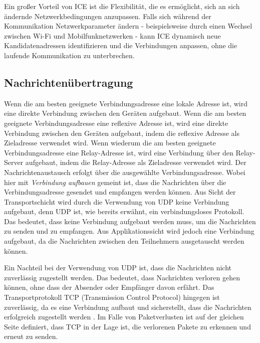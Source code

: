\noindent Ein großer Vorteil von ICE ist die Flexibilität, die es ermöglicht, sich an sich ändernde Netzwerkbedingungen anzupassen. Falls sich während der Kommunikation Netzwerkparameter ändern - beispielsweise durch einen Wechsel zwischen Wi-Fi und Mobilfunknetzwerken - kann ICE dynamisch neue Kandidatenadressen identifizieren und die Verbindungen anpassen, ohne die laufende Kommunikation zu unterbrechen.

\subsection{Nachrichtenübertragung}

Wenn die am besten geeignete Verbindungsadresse eine lokale Adresse ist, wird eine direkte Verbindung zwischen den Geräten aufgebaut. Wenn die am besten geeignete Verbindungsadresse eine reflexive Adresse ist, wird eine direkte Verbindung zwischen den Geräten aufgebaut, indem die reflexive Adresse als Zieladresse verwendet wird. Wenn wiederum die am besten geeignete Verbindungsadresse eine Relay-Adresse ist, wird eine Verbindung über den Relay-Server aufgebaut, indem die Relay-Adresse als Zieladresse verwendet wird. Der Nachrichtenaustausch erfolgt über die ausgewählte Verbindungsadresse. Wobei hier mit \textit{Verbindung aufbauen} gemeint ist, dass die Nachrichten über die Verbindungsadresse gesendet und empfangen werden können. Aus Sicht der Transportschicht wird durch die Verwendung von UDP keine Verbindung aufgebaut, denn UDP ist, wie bereits erwähnt, ein verbindungsloses Protokoll. Das bedeutet, dass keine Verbindung aufgebaut werden muss, um die Nachrichten zu senden und zu empfangen. Aus Applikationssicht wird jedoch eine Verbindung aufgebaut, da die Nachrichten zwischen den Teilnehmern ausgetauscht werden können.

Ein Nachteil bei der Verwendung von UDP ist, dass die Nachrichten nicht zuverlässig zugestellt werden. Das bedeutet, dass Nachrichten verloren gehen können, ohne dass der Absender oder Empfänger davon erfährt. Das Transportprotokoll TCP (Transmission Control Protocol) hingegen ist zuverlässig, da es eine Verbindung aufbaut und sicherstellt, dass die Nachrichten erfolgreich zugestellt werden \parencite[S. 36]{rfc9293_TCP}. Im Falle von Paketverlusten ist auf der gleichen Seite definiert, dass TCP in der Lage ist, die verlorenen Pakete zu erkennen und erneut zu senden.

